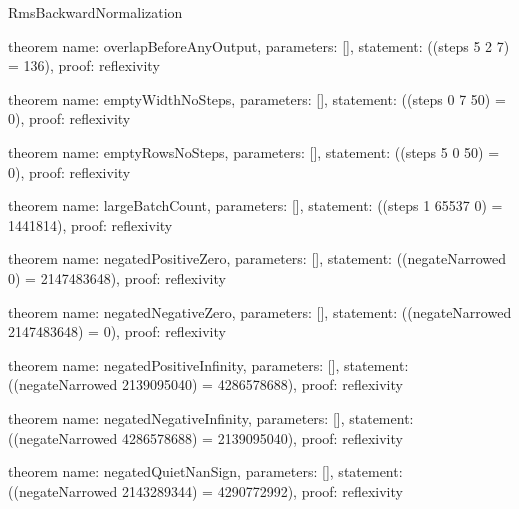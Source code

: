 \begin{lexlean}{RmsBackwardNormalization}
\begin{semanticmodule}
theorem{
  name: overlapBeforeAnyOutput,
  parameters: [],
  statement: ((steps 5 2 7) = 136),
  proof: reflexivity{}
}

theorem{
  name: emptyWidthNoSteps,
  parameters: [],
  statement: ((steps 0 7 50) = 0),
  proof: reflexivity{}
}

theorem{
  name: emptyRowsNoSteps,
  parameters: [],
  statement: ((steps 5 0 50) = 0),
  proof: reflexivity{}
}

theorem{
  name: largeBatchCount,
  parameters: [],
  statement: ((steps 1 65537 0) = 1441814),
  proof: reflexivity{}
}

theorem{
  name: negatedPositiveZero,
  parameters: [],
  statement: ((negateNarrowed 0) = 2147483648),
  proof: reflexivity{}
}

theorem{
  name: negatedNegativeZero,
  parameters: [],
  statement: ((negateNarrowed 2147483648) = 0),
  proof: reflexivity{}
}

theorem{
  name: negatedPositiveInfinity,
  parameters: [],
  statement: ((negateNarrowed 2139095040) = 4286578688),
  proof: reflexivity{}
}

theorem{
  name: negatedNegativeInfinity,
  parameters: [],
  statement: ((negateNarrowed 4286578688) = 2139095040),
  proof: reflexivity{}
}

theorem{
  name: negatedQuietNanSign,
  parameters: [],
  statement: ((negateNarrowed 2143289344) = 4290772992),
  proof: reflexivity{}
}
\end{semanticmodule}
\end{lexlean}
